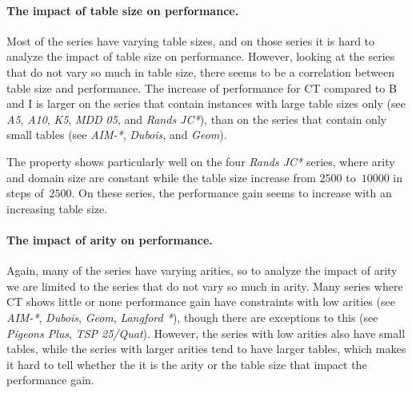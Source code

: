 \documentclass[a4paper,11pt]{article}
\numberwithin{equation}{section}
\begin{document}


\paragraph{The impact of table size on performance.}
Most of the series have varying table sizes, and on those series it is hard to
analyze the impact of table size on performance.
However, looking at the series that do not vary so much in table size,
there seems to be a correlation between table size and performance.
The increase
of performance for CT compared to B and I is larger on the series that contain 
instances with large table sizes only (see \emph{A5}, \emph{A10},
\emph{K5}, \emph{MDD 05}, and \emph{Rands JC*}), than on the series
that contain only small tables (see \emph{AIM-*}, \emph{Dubois}, and \emph{Geom}).

The property shows particularly well on the four \emph{Rands JC*} series, where
arity and domain size are constant while the table size increase from
$2500$ to~$10000$ in steps of~$2500$. On these series, the performance gain
seems to increase with an increasing table size.



\paragraph{The impact of arity on performance.}
Again, many of the series have varying arities, so to analyze the impact of arity
we are limited to the series that do not vary so much in arity.
Many series where CT shows little or none performance gain have
constraints with low arities (see \emph{AIM-*}, \emph{Dubois}, \emph{Geom},
\emph{Langford *}), though there are exceptions to this (see \emph{Pigeons Plus},
\emph{TSP 25/Quat}). 
However, the series with low arities also have small tables, while the series
with larger arities tend to have larger tables, which makes it hard to
tell whether the it is the arity or the table size that impact the performance gain.
\end{document}
